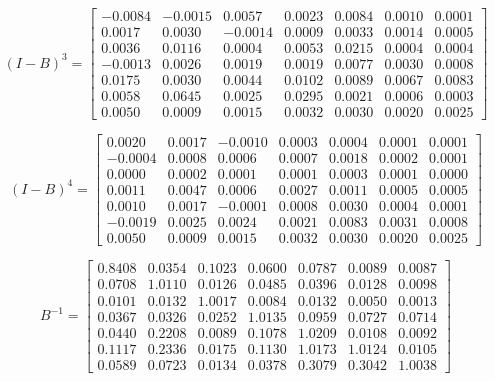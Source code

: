 \begin{example}
\[
(I-B)^3 = \begin{bmatrix}
   -0.0084 & -0.0015 & 0.0057 & 0.0023 & 0.0084 & 0.0010 & 0.0001 \\
    0.0017 & 0.0030 & -0.0014 & 0.0009 & 0.0033 & 0.0014 & 0.0005 \\
    0.0036 & 0.0116 & 0.0004 & 0.0053 & 0.0215 & 0.0004 & 0.0004 \\
   -0.0013 & 0.0026 & 0.0019 & 0.0019 & 0.0077 & 0.0030 & 0.0008 \\
    0.0175 & 0.0030 & 0.0044 & 0.0102 & 0.0089 & 0.0067 & 0.0083 \\
    0.0058 & 0.0645 & 0.0025 & 0.0295 & 0.0021 & 0.0006 & 0.0003 \\
    0.0050 & 0.0009 & 0.0015 & 0.0032 & 0.0030 & 0.0020 & 0.0025
\end{bmatrix}
\]

\[
(I-B)^4 = \begin{bmatrix}
    0.0020 & 0.0017 & -0.0010 & 0.0003 & 0.0004 & 0.0001 & 0.0001 \\
   -0.0004 & 0.0008 & 0.0006 & 0.0007 & 0.0018 & 0.0002 & 0.0001 \\
    0.0000 & 0.0002 & 0.0001 & 0.0001 & 0.0003 & 0.0001 & 0.0000 \\
    0.0011 & 0.0047 & 0.0006 & 0.0027 & 0.0011 & 0.0005 & 0.0005 \\
    0.0010 & 0.0017 & -0.0001 & 0.0008 & 0.0030 & 0.0004 & 0.0001 \\
   -0.0019 & 0.0025 & 0.0024 & 0.0021 & 0.0083 & 0.0031 & 0.0008 \\
    0.0050 & 0.0009 & 0.0015 & 0.0032 & 0.0030 & 0.0020 & 0.0025
\end{bmatrix}
\]



\[
B^{-1} =
\begin{bmatrix}
    0.8408 & 0.0354 & 0.1023 & 0.0600 & 0.0787 & 0.0089 & 0.0087 \\
    0.0708 & 1.0110 & 0.0126 & 0.0485 & 0.0396 & 0.0128 & 0.0098 \\
    0.0101 & 0.0132 & 1.0017 & 0.0084 & 0.0132 & 0.0050 & 0.0013 \\
    0.0367 & 0.0326 & 0.0252 & 1.0135 & 0.0959 & 0.0727 & 0.0714 \\
    0.0440 & 0.2208 & 0.0089 & 0.1078 & 1.0209 & 0.0108 & 0.0092 \\
    0.1117 & 0.2336 & 0.0175 & 0.1130 & 1.0173 & 1.0124 & 0.0105 \\
    0.0589 & 0.0723 & 0.0134 & 0.0378 & 0.3079 & 0.3042 & 1.0038
\end{bmatrix}
\]


\end{example}
